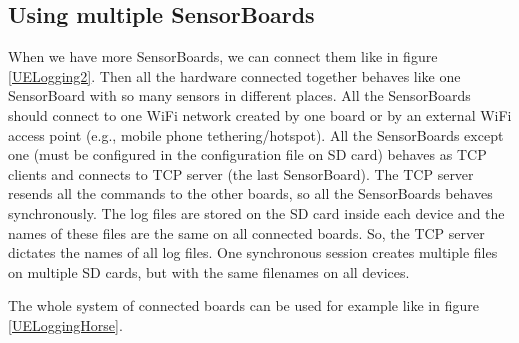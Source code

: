 \subsection{Using multiple SensorBoards}
When we have more SensorBoards, we can connect them like in figure \ref{UELogging2}. Then all the hardware connected together behaves like one SensorBoard with so many sensors in different places. All the SensorBoards should connect to one WiFi network created by one board or by an external WiFi access point (e.g., mobile phone tethering/hotspot). All the SensorBoards except one (must be configured in the configuration file on SD card) behaves as \ac{TCP} clients and connects to \ac{TCP} server (the last SensorBoard). The \ac{TCP} server resends all the commands to the other boards, so all the SensorBoards behaves synchronously. The log files are stored on the SD card inside each device and the names of these files are the same on all connected boards. So, the \ac{TCP} server dictates the names of all log files. One synchronous session creates multiple files on multiple SD cards, but with the same filenames on all devices.

The whole system of connected boards can be used for example like in figure \ref{UELoggingHorse}.
